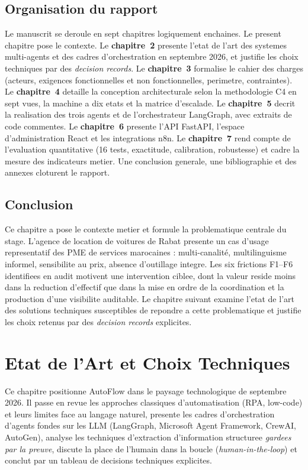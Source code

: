 \documentclass[12pt,a4paper,openany]{report}
\begin{document}
\section{Organisation du rapport}

Le manuscrit se deroule en sept chapitres logiquement enchaines. Le present chapitre pose le contexte. Le \textbf{chapitre~2} presente l'etat de l'art des systemes multi-agents et des cadres d'orchestration en septembre 2026, et justifie les choix techniques par des \emph{decision records}. Le \textbf{chapitre~3} formalise le cahier des charges (acteurs, exigences fonctionnelles et non fonctionnelles, perimetre, contraintes). Le \textbf{chapitre~4} detaille la conception architecturale selon la methodologie C4 en sept vues, la machine a dix etats et la matrice d'escalade. Le \textbf{chapitre~5} decrit la realisation des trois agents et de l'orchestrateur LangGraph, avec extraits de code commentes. Le \textbf{chapitre~6} presente l'API FastAPI, l'espace d'administration React et les integrations n8n. Le \textbf{chapitre~7} rend compte de l'evaluation quantitative (16 tests, exactitude, calibration, robustesse) et cadre la mesure des indicateurs metier. Une conclusion generale, une bibliographie et des annexes cloturent le rapport.

\section{Conclusion}

Ce chapitre a pose le contexte metier et formule la problematique centrale du stage. L'agence de location de voitures de Rabat presente un cas d'usage representatif des PME de services marocaines : multi-canalité, multilinguisme informel, sensibilite au prix, absence d'outillage integre. Les six frictions F1--F6 identifiees en audit motivent une intervention ciblee, dont la valeur reside moins dans la reduction d'effectif que dans la mise en ordre de la coordination et la production d'une visibilite auditable. Le chapitre suivant examine l'etat de l'art des solutions techniques susceptibles de repondre a cette problematique et justifie les choix retenus par des \emph{decision records} explicites.

\chapter{Etat de l'Art et Choix Techniques}\label{chap:etat_art}
Ce chapitre positionne AutoFlow dans le paysage technologique de septembre 2026. Il passe en revue les approches classiques d'automatisation (RPA, low-code) et leurs limites face au langage naturel, presente les cadres d'orchestration d'agents fondes sur les LLM (LangGraph, Microsoft Agent Framework, CrewAI, AutoGen), analyse les techniques d'extraction d'information structuree \emph{gardees par la preuve}, discute la place de l'humain dans la boucle (\emph{human-in-the-loop}) et conclut par un tableau de decisions techniques explicites.
\end{document}

